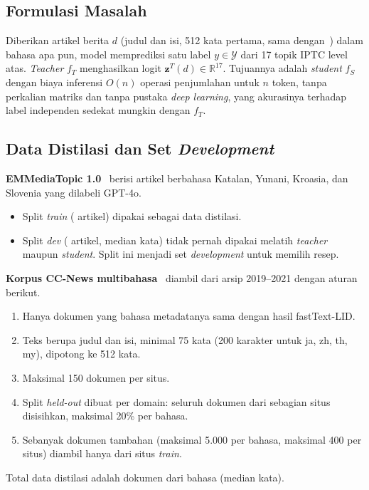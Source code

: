 \documentclass[journal]{IEEEtran}
\newcommand{\eng}[1]{\textit{#1}}   %
\begin{document}
\subsection{Formulasi Masalah}
Diberikan artikel berita $d$ (judul dan isi, 512 kata pertama, sama dengan~\cite{kuzman2025llm}) dalam bahasa apa pun, model memprediksi satu label $y\in\mathcal{Y}$ dari 17 topik IPTC level atas. \eng{Teacher} $f_T$ menghasilkan logit $\mathbf{z}^T(d)\in\mathbb{R}^{17}$. Tujuannya adalah \eng{student} $f_S$ dengan biaya inferensi $O(n)$ operasi penjumlahan untuk $n$ token, tanpa perkalian matriks dan tanpa pustaka \eng{deep learning}, yang akurasinya terhadap label independen sedekat mungkin dengan $f_T$.

\subsection{Data Distilasi dan Set \eng{Development}}
\textbf{EMMediaTopic 1.0}~\cite{kuzman2025llm,emmediatopic2025} berisi artikel berbahasa Katalan, Yunani, Kroasia, dan Slovenia yang dilabeli GPT-4o.
\begin{itemize}
  \item Split \eng{train} ( artikel) dipakai sebagai data distilasi.
  \item Split \eng{dev} ( artikel, median  kata) tidak pernah dipakai melatih \eng{teacher} maupun \eng{student}. Split ini menjadi set \eng{development} untuk memilih resep.
\end{itemize}

\textbf{Korpus CC-News multibahasa}~\cite{cloversearch_ccnews} diambil dari arsip 2019--2021 dengan aturan berikut.
\begin{enumerate}
  \item Hanya dokumen yang bahasa metadatanya sama dengan hasil fastText-LID.
  \item Teks berupa judul dan isi, minimal 75 kata (200 karakter untuk ja, zh, th, my), dipotong ke 512 kata.
  \item Maksimal 150 dokumen per situs.
  \item Split \eng{held-out} dibuat per domain: seluruh dokumen dari sebagian situs disisihkan, maksimal 20\% per bahasa.
  \item Sebanyak  dokumen tambahan (maksimal 5.000 per bahasa, maksimal 400 per situs) diambil hanya dari situs \eng{train}.
\end{enumerate}
Total data distilasi adalah  dokumen dari  bahasa (median  kata).
\end{document}
